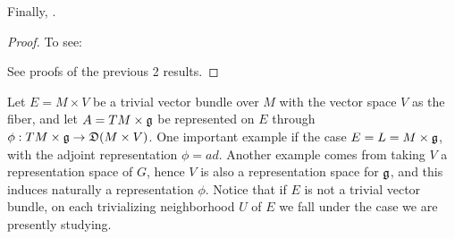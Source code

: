 \begin{theorem}
Finally, .
\end{theorem}


\begin{proof}
To see:

See proofs of the previous 2 results.

\end{proof}


\linea


Let $E = M \times V$ be a trivial vector bundle over $M$ with the vector space $V$ as the fiber, and let $A = TM \times \mathfrak{g}$ be represented on $E$ through $\phi: TM \times \alg g \to \alg D(M \times V)$. One important example if the case $E = L = M \times \mathfrak{g}$, with the adjoint representation $\phi = ad$. Another example comes from taking $V$ a representation space of $G$, hence $V$ is also a representation space for $\mathfrak{g}$, and this induces naturally a representation $\phi$. Notice that if $E$ is not a trivial vector bundle, on each trivializing neighborhood $U$ of $E$ we fall under the case we are presently studying.


